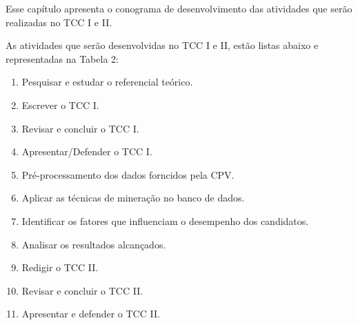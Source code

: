 \label{chapter:cronograma}

\par
Esse capítulo apresenta o conograma de desenvolvimento das atividades que serão realizadas no TCC I e II.

As atividades que serão desenvolvidas no TCC I e II, estão listas abaixo e representadas na Tabela 2:

\begin{enumerate}
  \item Pesquisar e estudar o referencial teórico.    
  \item Escrever o TCC I.
  \item Revisar e concluir o TCC I.
  \item Apresentar/Defender o TCC I.
  \item Pré-processamento dos dados forncidos pela CPV.
  \item Aplicar as técnicas de mineração no banco de dados.
  \item Identificar os fatores que influenciam o desempenho dos candidatos.
  \item Analisar os resultados alcançados. 
  \item Redigir o TCC II.
  \item Revisar e concluir o TCC II.
  \item Apresentar e defender o TCC II.
\end{enumerate}




